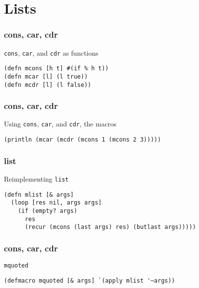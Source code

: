 \documentclass[aspectratio=169]{beamer}
\begin{document}
  \section{Lists}
  \begin{frame}[fragile]
    \frametitle{cons, car, cdr}
    \begin{listing}[H]
      \caption{\texttt{cons}, \texttt{car}, and \texttt{cdr} as functions}
      \begin{verbatim}
(defn mcons [h t] #(if % h t))
(defn mcar [l] (l true))
(defn mcdr [l] (l false))
      \end{verbatim}
    \end{listing}
  \end{frame}
  \begin{frame}[fragile]
    \frametitle{cons, car, cdr}
    \begin{listing}[H]
      \caption{Using \texttt{cons}, \texttt{car}, and \texttt{cdr}, the macros}
      \begin{verbatim}
(println (mcar (mcdr (mcons 1 (mcons 2 3)))))
      \end{verbatim}
    \end{listing}
  \end{frame}
  \begin{frame}[fragile]
    \frametitle{list}
    \begin{listing}[H]
      \caption{Reimplementing \texttt{list}}
      \begin{verbatim}
(defn mlist [& args]
  (loop [res nil, args args]
    (if (empty? args)
      res
      (recur (mcons (last args) res) (butlast args)))))
      \end{verbatim}
    \end{listing}
  \end{frame}
  \begin{frame}[fragile]
    \frametitle{cons, car, cdr}
    \begin{listing}[H]
      \caption{\texttt{mquoted}}
      \begin{verbatim}
(defmacro mquoted [& args] `(apply mlist '~args))
      \end{verbatim}
    \end{listing}
  \end{frame}
\end{document}
